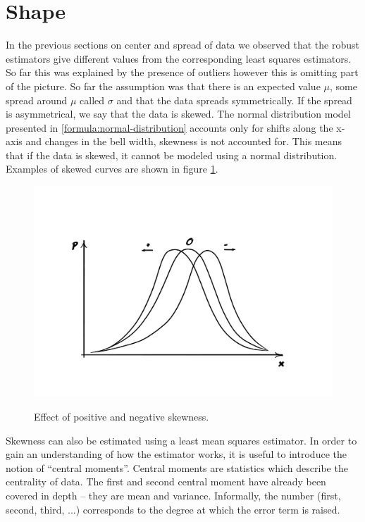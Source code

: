 \documentclass{tufte-book} %
\begin{document}
\section{Shape}
In the previous sections on center and spread of data we observed that the robust estimators give different values from the corresponding least squares estimators. So far this was explained by the presence of outliers however this is omitting part of the picture. So far the assumption was that there is an expected value $\mu$, some spread around $\mu$ called $\sigma$ and that the data spreads symmetrically. If the spread is asymmetrical, we say that the data is skewed. The normal distribution model presented in \ref{formula:normal-distribution} accounts only for shifts along the x-axis and changes in the bell width, skewness is not accounted for. This means that if the data is skewed, it cannot be modeled using a normal distribution. Examples of skewed curves are shown in figure \ref{img:skewness}.

\begin{figure}
	\centering
	\includegraphics[trim={4cm 3cm 4cm 5cm},clip]{graphics/skewness}
	\label{img:skewness}
	\caption{Effect of positive and negative skewness.}
\end{figure}

Skewness\cite{Doane2011} can also be estimated using a least mean squares estimator. In order to gain an understanding of how the estimator works, it is useful to introduce the notion of ``central moments''. Central moments are statistics which describe the centrality of data. The first and second central moment have already been covered in depth -- they are mean and variance. Informally, the number (first, second, third, ...) corresponds to the degree at which the error term is raised. 
\end{document}
